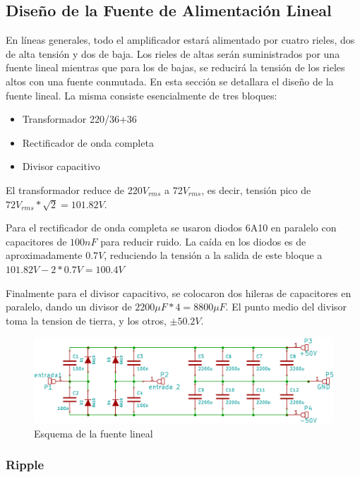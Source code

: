 \subsection{Diseño de la Fuente de Alimentación Lineal}
\bigskip 

En líneas generales, todo el amplificador estará alimentado por cuatro rieles, dos de alta tensión y dos de baja. Los rieles de altas serán suministrados por una fuente lineal mientras que para los de bajas, se reducirá la tensión de los rieles altos con una fuente conmutada. En esta sección se detallara el diseño de la fuente lineal. La misma consiste esencialmente de tres bloques:

\begin{itemize}
\item Transformador 220/36+36
\item Rectificador de onda completa
\item Divisor capacitivo 
\end{itemize}

El transformador reduce de 220$V_{rms}$ a 72$V_{rms}$, es decir, tensión pico de $72V_{rms}*\sqrt{2}=101.82V$.

Para el rectificador de onda completa se usaron diodos 6A10 en paralelo con capacitores de $100nF$ para reducir ruido. La caída en los diodos es de aproximadamente $0.7V$, reduciendo la tensión a la salida de este bloque a $101.82V-2*0.7V=100.4V$

Finalmente para el divisor capacitivo, se colocaron dos hileras de capacitores en paralelo, dando un divisor de $2200{\mu}F*4=8800{\mu}F$. El punto medio del divisor toma la tension de tierra, y los otros, $\pm50.2V$.


\begin{figure}[H]
\centering
\centerline{\includegraphics[scale=0.4]{img/esquema_fuente_lineal.png}}
\caption{Esquema de la fuente lineal}
\label{esquema_fuente_lineal} 
\end{figure}

\subsubsection*{Ripple}

